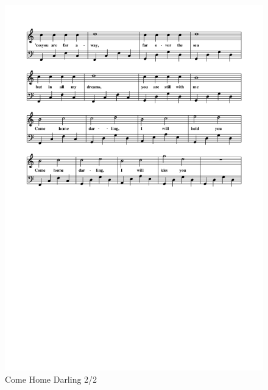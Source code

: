 \begin{figure}[!htbp]
  \includegraphics[width=\textwidth,height=\textheight,keepaspectratio]{../songs/14_come_home_darling_2.png}
  \caption{Come Home Darling 2/2}
  \label{fig:14_come_home_darling_2}
\end{figure}
